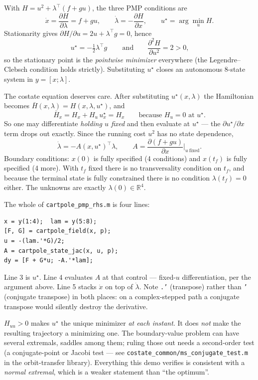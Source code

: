 \documentclass[11pt]{article}
\newcommand{\file}[1]{\texttt{#1}}
\newcommand{\R}{\mathbb{R}}
\newcommand{\tf}{t_f}
\begin{document}
\begin{rig}
With $H=u^2+\lambda^\top(f+gu)$, the three PMP conditions are
\[
\dot x = \frac{\partial H}{\partial\lambda}=f+gu,
\qquad
\dot\lambda = -\frac{\partial H}{\partial x},
\qquad
u^\star=\arg\min_u H .
\]
Stationarity gives $\partial H/\partial u = 2u+\lambda^\top g = 0$, hence
\[
\boxed{\,u^\star=-\tfrac12\lambda^\top g\,}
\qquad\text{and}\qquad
\frac{\partial^2H}{\partial u^2}=2>0,
\]
so the stationary point is the \emph{pointwise minimizer} everywhere (the
Legendre--Clebsch condition holds strictly). Substituting $u^\star$ closes an
autonomous 8-state system in $y=[x;\lambda]$.

The costate equation deserves care. After substituting $u^\star(x,\lambda)$ the
Hamiltonian becomes $\bar H(x,\lambda)=H(x,\lambda,u^\star)$, and
\[
\bar H_x = H_x + H_u\,u^\star_x = H_x
\qquad\text{because } H_u=0 \text{ at } u^\star .
\]
So one may differentiate \emph{holding $u$ fixed} and then evaluate at $u^\star$
--- the $\partial u^\star/\partial x$ term drops out exactly. Since the running
cost $u^2$ has no state dependence,
\[
\dot\lambda = -A(x,u^\star)^\top\lambda,
\qquad A = \frac{\partial (f+gu)}{\partial x}\bigg|_{u\ \text{fixed}} .
\]
Boundary conditions: $x(0)$ is fully specified (4 conditions) and $x(\tf)$ is
fully specified (4 more). With $\tf$ fixed there is no transversality condition
on $\tf$, and because the terminal state is fully constrained there is no
condition $\lambda(\tf)=0$ either. The unknowns are exactly $\lambda(0)\in\R^4$.

The whole of \file{cartpole\_pmp\_rhs.m} is four lines:

\begin{lstlisting}
x = y(1:4);  lam = y(5:8);
[F, G] = cartpole_field(x, p);
u = -(lam.'*G)/2;
A = cartpole_state_jac(x, u, p);
dy = [F + G*u; -A.'*lam];
\end{lstlisting}

Line 3 is $u^\star$. Line 4 evaluates $A$ at that control --- fixed-$u$
differentiation, per the argument above. Line 5 stacks $\dot x$ on top of
$\dot\lambda$. Note \texttt{.'} (transpose) rather than \texttt{'} (conjugate
transpose) in both places: on a complex-stepped path a conjugate transpose would
silently destroy the derivative.
\end{rig}

\begin{warn}
$H_{uu}>0$ makes $u^\star$ the unique minimizer \emph{at each instant}. It does
\emph{not} make the resulting trajectory a minimizing one. The boundary-value
problem can have several extremals, saddles among them; ruling those out needs a
second-order test (a conjugate-point or Jacobi test --- see
\file{costate\_common/ms\_conjugate\_test.m} in the orbit-transfer library).
Everything this demo verifies is consistent with a \emph{normal extremal},
which is a weaker statement than ``the optimum''.
\end{warn}
\end{document}
